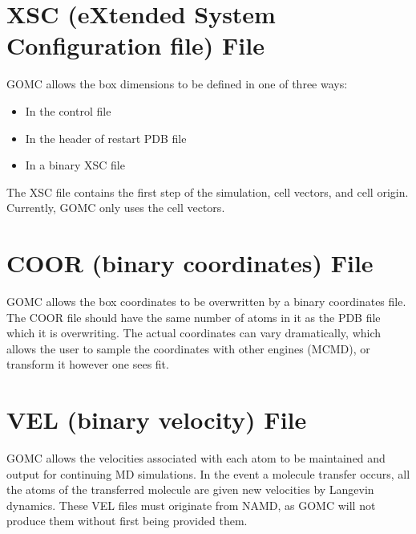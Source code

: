 \documentclass[letterpaper,10pt,english]{sphinxmanual}
\begin{document}
\section{XSC (eXtended System Configuration file) File}
\label{\detokenize{input_file:xsc-extended-system-configuration-file-file}}
\sphinxAtStartPar
GOMC allows the box dimensions to be defined in one of three ways:
\begin{itemize}
\item {} 
\sphinxAtStartPar
In the control file

\item {} 
\sphinxAtStartPar
In the header of restart PDB file

\item {} 
\sphinxAtStartPar
In a binary XSC file

\end{itemize}

\sphinxAtStartPar
The XSC file contains the first step of the simulation, cell vectors, and cell origin.  Currently, GOMC only uses the cell vectors.


\section{COOR (binary coordinates) File}
\label{\detokenize{input_file:coor-binary-coordinates-file}}
\sphinxAtStartPar
GOMC allows the box coordinates to be overwritten by a binary coordinates file.  The COOR file should have the same number of atoms in it as the PDB file which it is overwriting.  The actual coordinates can vary dramatically, which allows the user to sample the coordinates with other engines (MCMD), or transform it however one sees fit.


\section{VEL (binary velocity) File}
\label{\detokenize{input_file:vel-binary-velocity-file}}
\sphinxAtStartPar
GOMC allows the velocities associated with each atom to be maintained and output for continuing MD simulations.  In the event a molecule transfer occurs, all the atoms of the transferred molecule are given new velocities by Langevin dynamics.  These VEL files must originate from NAMD, as GOMC will not produce them without first being provided them.
\end{document}
